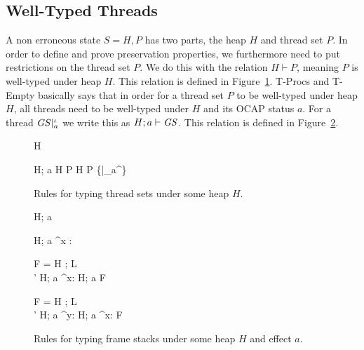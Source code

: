 \subsection{Well-Typed Threads}%
\label{sub:well_typed_threads}

A non erroneous state $S = H, P$ has two parts, the heap $H$ and thread set $P$.
In order to define and prove preservation properties, we furthermore need to put
restrictions on the thread set $P$. We do this with the relation $H \vdash P$,
meaning $P$ is well-typed under heap $H$. This relation is defined in
Figure~\ref{fig:ts_typing}.  {\sc T-Procs} and {\sc T-Empty} basically says that
in order for a thread set $P$ to be well-typed under heap $H$, all threads need
to be well-typed under $H$ and its OCAP status $a$.  For a thread $\mathit{GS}|_a^\iota$
we write this as $H; a \vdash \mathit{GS}$. This relation is defined in
Figure~\ref{fig:fs_typing}. 

\begin{figure}
  {H \vdash \emptyset}

  \RuleSpace{}

  { H; a \vdash \FS \andalso H \vdash P }
  { H \vdash P \cup \left\{\FS |_a^\iota \right\} }

  \caption{Rules for typing thread sets under some heap $H$.}
  \label{fig:ts_typing}
\end{figure}

\begin{figure}
  {H; a \vdash \varepsilon}

  \RuleSpace{}

  {H; a \vdash^{x : \sigma} \varepsilon}

  \RuleSpace{}

  { F =  \andalso H \vdash \Gamma; L \\
   \andalso \sigma' \stof \sigma \andalso H; a \vdash^{x: \sigma} \FS }
  { H; a \vdash F \circ \FS }
  
  \RuleSpace{}

  { F =  \andalso H \vdash \Gamma; L \\
   \andalso \sigma' \stof \sigma 
  \andalso H; a \vdash^{y: \sigma} \FS }
  { H; a \vdash^{x: \tau} F \circ \FS }

  \caption{Rules for typing frame stacks under some heap $H$ and effect $a$.}
  \label{fig:fs_typing}
\end{figure}

